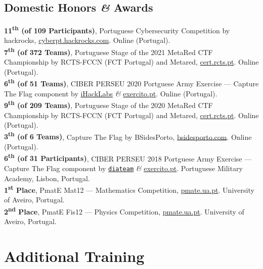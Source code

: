 \documentclass[10pt, a4paper]{article}
\newcommand{\years}[1]{\marginnote{\raggedleft\footnotesize #1}}
\begin{document}
\subsection*{Domestic Honors \textit{\&} Awards}
\years{2022} 
\textbf{11\textsuperscript{th} \small{(of 109 Participants)}},  Portuguese Cybersecurity Competition by hackrocks, \href{https://cyberpt.hackrocks.com/}{cyberpt.hackrocks.com}. Online (Portugal).
\\[0.42em]
\years{2021} 
\textbf{7\textsuperscript{th} \small{(of 372 Teams)}}, Portuguese Stage of the 2021 MetaRed CTF Championship by RCTS-FCCN (FCT Portugal) and Metared, \href{https://cert.rcts.pt/}{cert.rcts.pt}. Online (Portugal).
\\[0.42em]
\years{2020}  
\textbf{6\textsuperscript{th} \small{(of 51 Teams)}}, CIBER PERSEU 2020 Portguese Army Exercise --- Capture The Flag component by \href{https://www.ihacklabs.com/}{iHackLabs} \textit{\&} \href{http://exercito.pt/}{exercito.pt}. Online (Portugal).
\\[0.42em]
\textbf{9\textsuperscript{th} \small{(of 209 Teams)}}, Portuguese Stage of the 2020 MetaRed CTF Championship by RCTS-FCCN (FCT Portugal) and Metared, \href{https://cert.rcts.pt/}{cert.rcts.pt}. Online (Portugal).
\\[0.42em]
\textbf{3\textsuperscript{th} \small{(of 6 Teams)}}, Capture The Flag by BSidesPorto, \href{https://bsidesporto.com/}{bsidesporto.com}. Online (Portugal).
\\[0.42em]
\years{2018}  
\textbf{6\textsuperscript{th} \small{(of 31 Participants)}}, CIBER PERSEU 2018 Portguese Army Exercise --- Capture The Flag component by \href{https://www.diateam.net}{\texttt{diateam}} \textit{\&} \href{http://exercito.pt/}{exercito.pt}. Portuguese Military Academy, Lisbon, Portugal.
\\[0.42em]
\years{2011} 
\textbf{1\textsuperscript{st} Place}, PmatE Mat12 --- Mathematics Competition, \href{http://pmate.ua.pt/}{pmate.ua.pt}. University of Aveiro, Portugal.
\\[0.42em]
\years{2009}  
\textbf{2\textsuperscript{nd} Place}, PmatE Fis12 --- Physics Competition, 
\href{http://pmate.ua.pt/}{pmate.ua.pt}. University of Aveiro, Portugal.



\section*{Additional Training}
\end{document}
